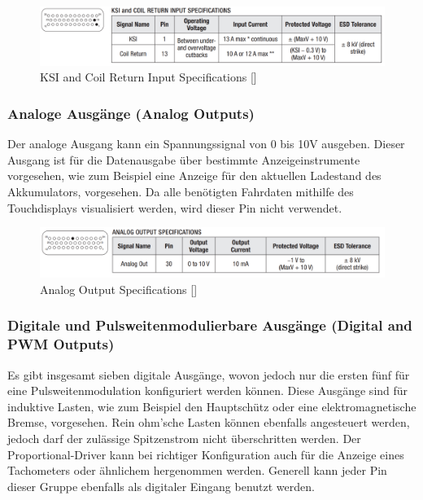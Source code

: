 \begin{figure}[H]
	\begin{center}
		\includegraphics[width=\textwidth]{figures/antrieb/KSI_CoilReturn_Input_Specifications.png}
		\caption{KSI and Coil Return Input Specifications [\cite{Manual}]}
	\end{center}
\end{figure}



\subsubsection{Analoge Ausgänge (Analog Outputs)}
\label{Analoge_Ausgaenge}
Der analoge Ausgang kann ein Spannungssignal von 0 bis 10V ausgeben. Dieser Ausgang ist für die Datenausgabe über bestimmte Anzeigeinstrumente vorgesehen, wie zum Beispiel eine Anzeige für den aktuellen Ladestand des Akkumulators, vorgesehen. Da alle benötigten Fahrdaten mithilfe des Touchdisplays visualisiert werden, wird dieser Pin nicht verwendet.

\begin{figure}[H]
	\begin{center}
		\includegraphics[width=\textwidth]{figures/antrieb/Analog_Output_Specifications.png}
		\caption{Analog Output Specifications [\cite{Manual}]}
	\end{center}
\end{figure}


\newpage



\subsubsection{Digitale und Pulsweitenmodulierbare Ausgänge (Digital and PWM Outputs)}
\label{Digitale-PWM_Ausgaenge}
Es gibt insgesamt sieben digitale Ausgänge, wovon jedoch nur die ersten fünf für eine Pulsweitenmodulation konfiguriert werden können. Diese Ausgänge sind für induktive Lasten, wie zum Beispiel den Hauptschütz oder eine elektromagnetische Bremse, vorgesehen. Rein ohm'sche Lasten können ebenfalls angesteuert werden, jedoch darf der zulässige Spitzenstrom nicht überschritten werden. Der Proportional-Driver kann bei richtiger Konfiguration auch für die Anzeige eines Tachometers oder ähnlichem hergenommen werden. Generell kann jeder Pin dieser Gruppe ebenfalls als digitaler Eingang benutzt werden.

